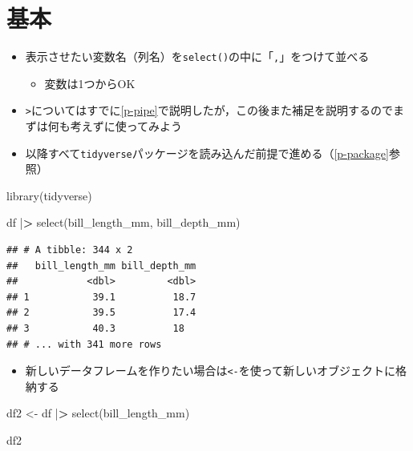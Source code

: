 \documentclass[
  xelatex,ja=standard, b5paper]{bxjsbook}
\newenvironment{Shaded}{\begin{snugshade}}{\end{snugshade}}
\newcommand{\ErrorTok}[1]{\textcolor[rgb]{0.64,0.00,0.00}{\textbf{#1}}}
\newcommand{\FunctionTok}[1]{\textcolor[rgb]{0.00,0.00,0.00}{#1}}
\newcommand{\NormalTok}[1]{#1}
\newcommand{\OtherTok}[1]{\textcolor[rgb]{0.56,0.35,0.01}{#1}}
\newcommand{\SpecialCharTok}[1]{\textcolor[rgb]{0.00,0.00,0.00}{#1}}
\providecommand{\tightlist}{%
  \setlength{\itemsep}{0pt}\setlength{\parskip}{0pt}}
\begin{document}
\hypertarget{select-standard}{%
\section{基本}\label{select-standard}}

\begin{itemize}
\tightlist
\item
  表示させたい変数名（列名）を\texttt{select()}の中に「\texttt{,}」をつけて並べる

  \begin{itemize}
  \tightlist
  \item
    変数は1つからOK
  \end{itemize}
\item
  \texttt{\textbar{}\textgreater{}}についてはすでに\ref{p-pipe}で説明したが，この後また補足を説明するのでまずは何も考えずに使ってみよう
\item
  以降すべて\texttt{tidyverse}パッケージを読み込んだ前提で進める（\ref{p-package}参照）
\end{itemize}

\begin{Shaded}
\begin{Highlighting}[]
\FunctionTok{library}\NormalTok{(tidyverse)}

\NormalTok{df }\SpecialCharTok{|}\ErrorTok{\textgreater{}} 
  \FunctionTok{select}\NormalTok{(bill\_length\_mm, bill\_depth\_mm)}
\end{Highlighting}
\end{Shaded}

\begin{verbatim}
## # A tibble: 344 x 2
##   bill_length_mm bill_depth_mm
##            <dbl>         <dbl>
## 1           39.1          18.7
## 2           39.5          17.4
## 3           40.3          18  
## # ... with 341 more rows
\end{verbatim}

\begin{itemize}
\tightlist
\item
  新しいデータフレームを作りたい場合は\texttt{\textless{}-}を使って新しいオブジェクトに格納する
\end{itemize}

\begin{Shaded}
\begin{Highlighting}[]
\NormalTok{df2 }\OtherTok{\textless{}{-}} 
\NormalTok{  df }\SpecialCharTok{|}\ErrorTok{\textgreater{}} \FunctionTok{select}\NormalTok{(bill\_length\_mm)}

\NormalTok{df2}
\end{Highlighting}
\end{Shaded}
\end{document}
